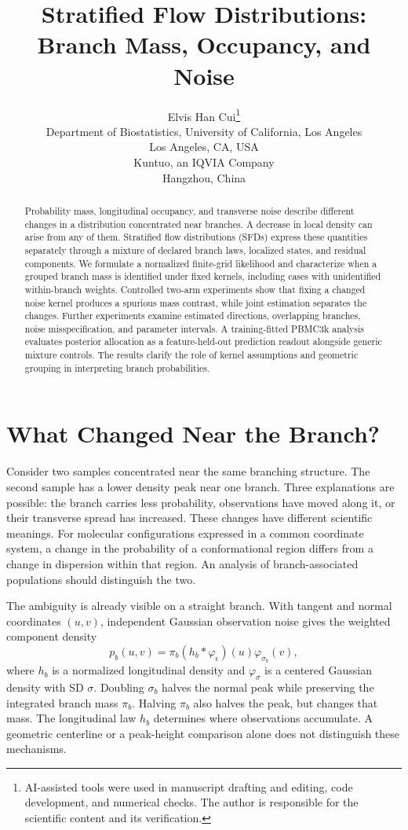 \documentclass[10pt]{article}
\title{Stratified Flow Distributions:\\Branch Mass, Occupancy, and Noise}
\author{Elvis Han Cui\thanks{AI-assisted tools were used in manuscript
drafting and editing, code development, and numerical checks. The author
is responsible for the scientific content and its verification.}\\
Department of Biostatistics, University of California, Los Angeles\\
Los Angeles, CA, USA\\[0.3em]
Kuntuo, an IQVIA Company\\
Hangzhou, China}
\theoremstyle{definition}
\theoremstyle{plain}
\begin{document}
\maketitle

\begin{abstract}
Probability mass, longitudinal occupancy, and transverse noise describe
different changes in a distribution concentrated near branches. A decrease
in local density can arise from any of them. Stratified flow distributions
(SFDs) express these quantities separately through a mixture of declared
branch laws, localized states, and residual components. We formulate a
normalized finite-grid likelihood and characterize when a grouped branch
mass is identified under fixed kernels, including cases with unidentified
within-branch weights. Controlled two-arm experiments show that fixing a
changed noise kernel produces a spurious mass contrast, while joint
estimation separates the changes. Further experiments examine estimated
directions, overlapping branches, noise misspecification, and parameter
intervals. A training-fitted PBMC3k analysis evaluates posterior allocation
as a feature-held-out prediction readout alongside generic mixture controls.
The results clarify the role of kernel assumptions and geometric grouping
in interpreting branch probabilities.
\end{abstract}

\section{What Changed Near the Branch?}
\label{sec:introduction}
Consider two samples concentrated near the same branching structure. The
second sample has a lower density peak near one branch. Three explanations
are possible: the branch carries less probability, observations have moved
along it, or their transverse spread has increased. These changes have
different scientific meanings. For molecular configurations expressed in a
common coordinate system, a change in the probability of a conformational
region differs from a change in dispersion within that region. An analysis
of branch-associated populations should distinguish the two.

The ambiguity is already visible on a straight branch. With tangent and
normal coordinates $(u,v)$, independent Gaussian observation noise gives the
weighted component density
\begin{equation}
 p_b(u,v)=\pi_b(h_b*\varphi_\epsilon)(u)\varphi_{\sigma_b}(v),
 \label{eq:motivation}
\end{equation}
where $h_b$ is a normalized longitudinal density and $\varphi_\sigma$ is a
centered Gaussian density with SD $\sigma$. Doubling $\sigma_b$ halves the
normal peak while preserving the integrated branch mass $\pi_b$. Halving
$\pi_b$ also halves the peak, but changes that mass. The longitudinal law
$h_b$ determines where observations accumulate. A geometric centerline or a
peak-height comparison alone does not distinguish these mechanisms.
\end{document}
